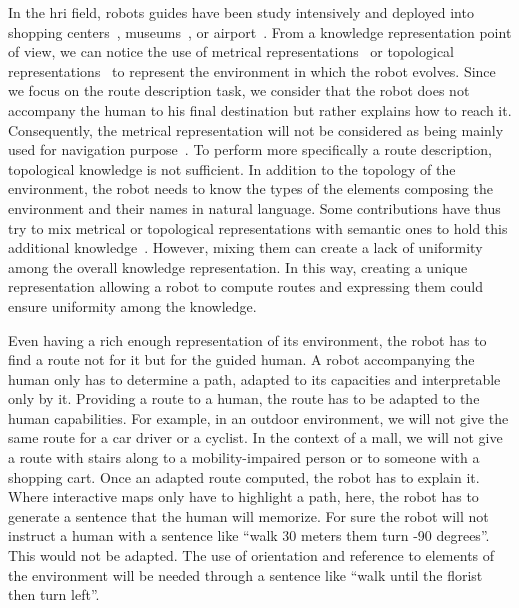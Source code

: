 In the \acrfull{hri} field, robots guides have been study intensively and deployed into shopping centers~\cite{okuno_2009_providing}, museums~\cite{burgard_1999_museum, clodic_2006_rackham, siegwart_2003_robox}, or airport~\cite{triebel_2016_spencer}. From a knowledge representation point of view, we can notice the use of metrical representations~\cite{thrun_2007_simultaneous} or topological representations~\cite{morales_2011_modeling} to represent the environment in which the robot evolves. Since we focus on the route description task, we consider that the robot does not accompany the human to his final destination but rather explains how to reach it. Consequently, the metrical representation will not be considered as being mainly used for navigation purpose~\cite{thrun_2007_simultaneous}. To perform more specifically a route description, topological knowledge is not sufficient. In addition to the topology of the environment, the robot needs to know the types of the elements composing the environment and their names in natural language. Some contributions have thus try to mix metrical or topological representations with semantic ones to hold this additional knowledge~\cite {satake_2015_should, chrastil_2014_cognitive, zender_2008_conceptual}. However, mixing them can create a lack of uniformity among the overall knowledge representation. In this way, creating a unique representation allowing a robot to compute routes and expressing them could ensure uniformity among the knowledge.

Even having a rich enough representation of its environment, the robot has to find a route not for it but for the guided human. A robot accompanying the human only has to determine a path, adapted to its capacities and interpretable only by it. Providing a route to a human, the route has to be adapted to the human capabilities. For example, in an outdoor environment, we will not give the same route for a car driver or a cyclist. In the context of a mall, we will not give a route with stairs along to a mobility-impaired person or to someone with a shopping cart. Once an adapted route computed, the robot has to explain it. Where interactive maps only have to highlight a path, here, the robot has to generate a sentence that the human will memorize. For sure the robot will not instruct a human with a sentence like ``walk 30 meters them turn -90 degrees''. This would not be adapted. The use of orientation and reference to elements of the environment will be needed through a sentence like ``walk until the florist then turn left''.

